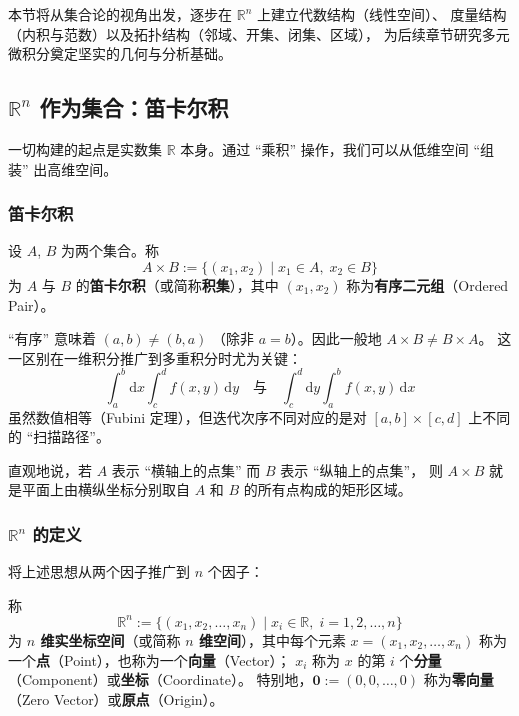 \documentclass[lang=cn,11pt]{elegantbook}
\begin{document}
本节将从集合论的视角出发，逐步在 $\mathbb{R}^n$ 上建立代数结构（线性空间）、
度量结构（内积与范数）以及拓扑结构（邻域、开集、闭集、区域），
为后续章节研究多元微积分奠定坚实的几何与分析基础。


\subsection{$\mathbb{R}^n$ 作为集合：笛卡尔积}

一切构建的起点是实数集 $\mathbb R$ 本身。通过 ``乘积'' 操作，我们可以从低维空间 ``组装'' 出高维空间。

\subsubsection*{笛卡尔积}

\begin{definition} \label{def:cartesian-product}
设 $A$, $B$ 为两个集合。称
\[
A\times B:=\bigl\{(x_1,x_2)\mid x_1\in A,\;x_2\in B\bigr\}
\]
为 $A$ 与 $B$ 的\textbf{笛卡尔积}（或简称\textbf{积集}），其中 $(x_1,x_2)$ 称为\textbf{有序二元组}（Ordered Pair）。
\end{definition}

\begin{note}[有序性的重要意义]
``有序'' 意味着 $(a,b) \neq (b,a)$ （除非 $a=b$）。因此一般地 $A\times B \neq B\times A$。
这一区别在一维积分推广到多重积分时尤为关键：
\[
\int_a^b\!\mathrm{d}x\int_c^d f(x,y)\,\mathrm{d}y \quad \text{与} \quad \int_c^d\!\mathrm{d}y\int_a^b f(x,y)\,\mathrm{d}x
\]
虽然数值相等（Fubini 定理），但迭代次序不同对应的是对 $[a,b]\times[c,d]$ 上不同的 ``扫描路径''。
\end{note}

直观地说，若 $A$ 表示 ``横轴上的点集'' 而 $B$ 表示 ``纵轴上的点集''，
则 $A\times B$ 就是平面上由横纵坐标分别取自 $A$ 和 $B$ 的所有点构成的矩形区域。

\subsubsection*{$\mathbb{R}^n$ 的定义}

将上述思想从两个因子推广到 $n$ 个因子：

\begin{definition}[$n$ 维实坐标空间] \label{def:rn-set}
称
\[
\boxed{\;
\mathbb R^n:=\bigl\{(x_1,x_2,\dots,x_n)\mid x_i\in\mathbb R,\;i=1,2,\dots,n\bigr\}\;}
\]
为 \textbf{$n$ 维实坐标空间}（或简称 \textbf{$n$ 维空间}），其中每个元素
$x=(x_1,x_2,\dots,x_n)$ 称为一个\textbf{点}（Point），也称为一个\textbf{向量}（Vector）；
$x_i$ 称为 $x$ 的第 $i$ 个\textbf{分量}（Component）或\textbf{坐标}（Coordinate）。
特别地，$\boldsymbol 0:=(0,0,\dots,0)$ 称为\textbf{零向量}（Zero Vector）或\textbf{原点}（Origin）。
\end{definition}
\end{document}
